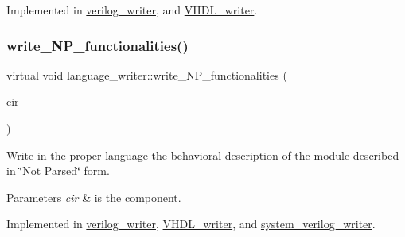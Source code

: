 Implemented in \hyperlink{classverilog__writer_a429d09829b565c8bb4b243b0eb089546}{verilog\+\_\+writer}, and \hyperlink{structVHDL__writer_a0c54febb526f68c5d71314576086ec3b}{V\+H\+D\+L\+\_\+writer}.

\mbox{\label{classlanguage__writer_a75a800dc2e7afbecf76f1acaae82b6ce}} 
\subsubsection{\texorpdfstring{write\+\_\+\+N\+P\+\_\+functionalities()}{write\_NP\_functionalities()}}
{\footnotesize\ttfamily virtual void language\+\_\+writer\+::write\+\_\+\+N\+P\+\_\+functionalities (\begin{DoxyParamCaption}\item[{const \hyperlink{structural__objects_8hpp_a8ea5f8cc50ab8f4c31e2751074ff60b2}{structural\+\_\+object\+Ref} \&}]{cir }\end{DoxyParamCaption})\hspace{0.3cm}{\ttfamily [pure virtual]}}



Write in the proper language the behavioral description of the module described in \char`\"{}\+Not Parsed\char`\"{} form. 


\begin{DoxyParams}{Parameters}
{\em cir} & is the component. \\
\hline
\end{DoxyParams}


Implemented in \hyperlink{classverilog__writer_ab4539a1601893c0c86f57bb66da56e45}{verilog\+\_\+writer}, \hyperlink{structVHDL__writer_a479a39c4d3b15e8052100fca87a45717}{V\+H\+D\+L\+\_\+writer}, and \hyperlink{classsystem__verilog__writer_ad9f3428bb7369c26e54a1b7ff7119d9c}{system\+\_\+verilog\+\_\+writer}.

\mbox{\label{classlanguage__writer_aae06225ee079da7199d6f7e9f35fa108}} 
